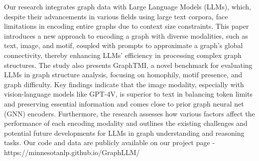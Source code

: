 Our research integrates graph data with Large Language Models (LLMs), which, despite their advancements in various fields using large text corpora, face limitations in encoding entire graphs due to context size constraints. This paper introduces a new approach to encoding a graph with diverse modalities, such as text, image, and motif, coupled with prompts to approximate a graph's global connectivity, thereby enhancing LLMs' efficiency in processing complex graph structures. The study also presents GraphTMI, a novel benchmark for evaluating LLMs in graph structure analysis, focusing on homophily, motif presence, and graph difficulty. Key findings indicate that the image modality, especially with vision-language models like GPT-4V, is superior to text in balancing token limits and preserving essential information and comes close to prior graph neural net (GNN) encoders. Furthermore, the research assesses how various factors affect the performance of each encoding modality and outlines the existing challenges and potential future developments for LLMs in graph understanding and reasoning tasks. Our code and data are publicly available on our project page - https://minnesotanlp.github.io/GraphLLM/